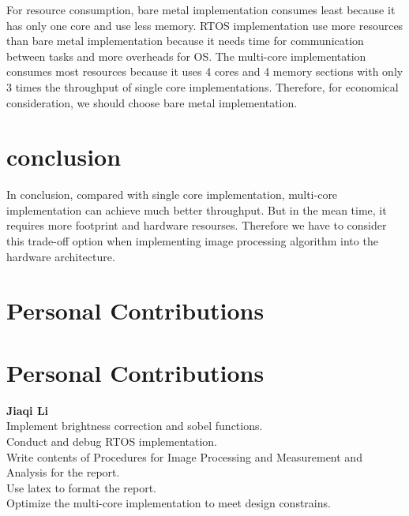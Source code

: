 \documentclass[conference,compsoc]{IEEEtran}
\begin{document}
  For resource consumption, bare metal implementation consumes least because it has only one core and use less memory. RTOS implementation use more resources than 
  bare metal implementation because it needs time for communication between tasks and more overheads for OS. The multi-core implementation consumes 
  most resources because it uses 4 cores and 4 memory sections with only 3 times the throughput of single core implementations. Therefore, for economical consideration,
   we should choose bare metal implementation.
\section{conclusion}
\par In conclusion, compared with single core implementation, multi-core implementation can achieve much better throughput. But in the mean time, it requires more footprint and hardware resourses. Therefore we have to consider this trade-off option when implementing image processing algorithm into the hardware architecture. 
    \ifCLASSOPTIONcompsoc
      \section*{Personal Contributions}
    \else

      \section*{Personal Contributions}
    \fi
    \textbf{Jiaqi Li}\\
    Implement brightness correction and sobel functions.\\
    Conduct and debug RTOS implementation.\\
    Write contents of Procedures for Image Processing and Measurement and Analysis for the report.\\
    Use latex to format the report.\\
    Optimize the multi-core implementation to meet design constrains.
\end{document}
